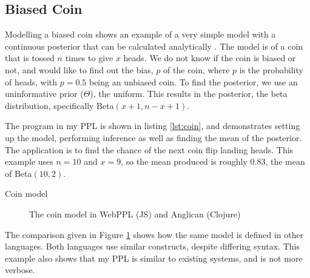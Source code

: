 \subsection{Biased Coin} \label{sec:coin} 
Modelling a biased coin shows an example of a very simple model with a continuous posterior that can be calculated analytically \cite{datasci}. 
% 
The model is of a coin that is tossed $n$ times to give $x$ heads. We do not know if the coin is biased or not, and would like to find out the bias, $p$ of the coin, where $p$ is the probability of heads, with $p=0.5$ being an unbiased coin.
% 
To find the posterior, we use an uninformative prior ($\Theta$), the uniform. This results in the posterior, the beta distribution, specifically Beta$(x+1,n-x+1)$.

The program in my PPL is shown in listing \ref{lst:coin}, and demonstrates setting up the model, performing inference as well as finding the mean of the posterior. The application is to find the chance of the next coin flip landing heads. This example uses $n=10$ and $x=9$, so the mean produced is roughly 0.83, the mean of Beta$(10,2)$.

\begin{listing}[!ht]
	\caption{Coin model}
	\label{lst:coin}
\end{listing}


\begin{figure}[!htb]
	\begin{minipage}{0.5\textwidth}
		\centering
	\end{minipage}
	\begin{minipage}{0.5\textwidth}
		\centering
	\end{minipage}
	\caption{The coin model in WebPPL (JS) and Anglican (Clojure)}
	\label{fig:compare-coin}
\end{figure}

The comparison given in Figure \ref{fig:compare-coin} shows how the same model is defined in other languages. Both languages use similar constructs, despite differing syntax. This example also shows that my PPL is similar to existing systems, and is not more verbose.

